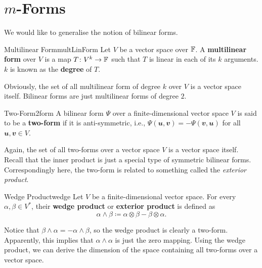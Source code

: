 \documentclass[math]{amznotes}
\theoremstyle{remark}
\begin{document}
\section{$m$-Forms}
We would like to generalise the notion of bilinear forms.
\begin{dfnbox}{Multilinear Form}{multLinForm}
    Let $V$ be a vector space over $\mathbb{F}$. A {\color{red} \textbf{multilinear form}} over $V$ is a map $T \colon V^k \to \mathbb{F}$ such that $T$ is linear in each of its $k$ arguments. $k$ is known as the {\color{red} \textbf{degree}} of $T$.
\end{dfnbox}
Obviously, the set of all multilinear form of degree $k$ over $V$ is a vector space itself. Bilinear forms are just multilinear forms of degree $2$. 
\begin{dfnbox}{Two-Form}{2form}
    A bilinear form $\Psi$ over a finite-dimensional vector space $V$ is said to be a {\color{red} \textbf{two-form}} if it is anti-symmetric, i.e., $\Psi(\mathbfit{u}, \mathbfit{v}) = -\Psi(\mathbfit{v}, \mathbfit{u})$ for all $\mathbfit{u}, \mathbfit{v} \in V$.
\end{dfnbox}
Again, the set of all two-forms over a vector space $V$ is a vector space itself. Recall that the inner product is just a special type of symmetric bilinear forms. Correspondingly here, the two-form is related to something called the \textit{exterior product}.
\begin{dfnbox}{Wedge Product}{wedge}
    Let $V$ be a finite-dimensional vector space. For every $\alpha, \beta \in V^*$, their {\color{red} \textbf{wedge product}} or {\color{red} \textbf{exterior product}} is defined as 
    \begin{equation*}
        \alpha \wedge \beta \coloneqq \alpha \otimes \beta - \beta \otimes \alpha.
    \end{equation*}
\end{dfnbox}
Notice that $\beta \wedge \alpha = -\alpha \wedge \beta$, so the wedge product is clearly a two-form. Apparently, this implies that $\alpha \wedge \alpha$ is just the zero mapping. Using the wedge product, we can derive the dimension of the space containing all two-forms over a vector space.
\end{document}
